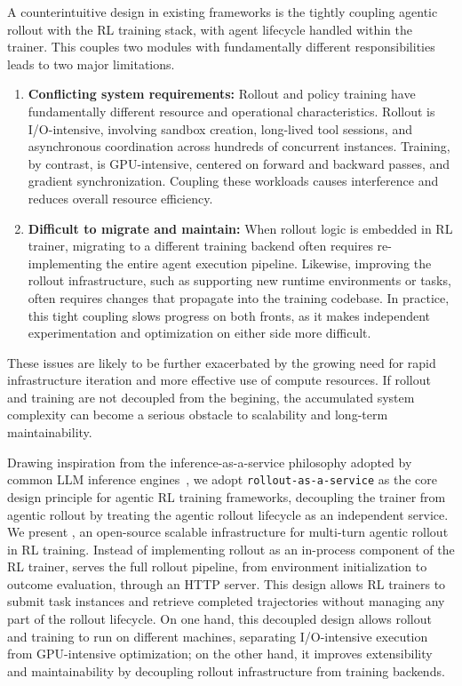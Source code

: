 A counterintuitive design in existing frameworks is the tightly coupling agentic rollout with the RL training stack, with agent lifecycle handled within the trainer. This couples two modules with fundamentally different responsibilities leads to two major limitations.
\begin{enumerate}
    \item \textbf{Conflicting system requirements:} Rollout and policy training have fundamentally different resource and operational characteristics. Rollout is I/O-intensive, involving sandbox creation, long-lived tool sessions, and asynchronous coordination across hundreds of concurrent instances. Training, by contrast, is GPU-intensive, centered on forward and backward passes, and gradient synchronization. Coupling these workloads causes interference and reduces overall resource efficiency.
    \item \textbf{Difficult to migrate and maintain:} When rollout logic is embedded in RL trainer, migrating to a different training backend often requires re-implementing the entire agent execution pipeline. Likewise, improving the rollout infrastructure, such as supporting new runtime environments or tasks, often requires changes that propagate into the training codebase. In practice, this tight coupling slows progress on both fronts, as it makes independent experimentation and optimization on either side more difficult.
\end{enumerate}
These issues are likely to be further exacerbated by the growing need for rapid infrastructure iteration and more effective use of compute resources. If rollout and training are not decoupled from the begining, the accumulated system complexity can become a serious obstacle to scalability and long-term maintainability.

Drawing inspiration from the inference-as-a-service philosophy adopted by common LLM inference engines~\citep{kwon2025vllm, zheng2024sglang}, we adopt \texttt{rollout-as-a-service} as the core design principle for agentic RL training frameworks, decoupling the trainer from agentic rollout by treating the agentic rollout lifecycle as an independent service. 
We present \prorlagent, an open-source scalable infrastructure for multi-turn agentic rollout in RL training. 
Instead of implementing rollout as an in-process component of the RL trainer, \prorlagent serves the full rollout pipeline, from environment initialization to outcome evaluation, through an HTTP server. 
This design allows RL trainers to submit task instances and retrieve completed trajectories without managing any part of the rollout lifecycle. 
On one hand, this decoupled design allows rollout and training to run on different machines, separating I/O-intensive execution from GPU-intensive optimization; on the other hand, it improves extensibility and maintainability by decoupling rollout infrastructure from training backends.

